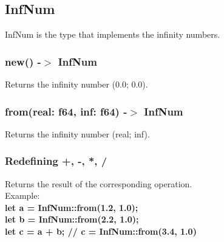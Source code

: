 \documentclass[]{article}
\begin{document}
			\subsection{InfNum}
				\Large{InfNum is the type that implements the infinity numbers.}
				\subsubsection{new() -$>$ InfNum}
					Returns the infinity number (0.0; 0.0).
				\subsubsection{from(real: f64, inf: f64) -$>$ InfNum}
					Returns the infinity number (real; inf).
				\subsubsection{Redefining +, -, *, /}
					Returns the result of the corresponding operation.\\Example:\\
					\large{\textbf{let a = InfNum::from(1.2, 1.0);\\
						let b = InfNum::from(2.2, 1.0);\\
						let c = a + b; // c = InfNum::from(3.4, 1.0)}}
\end{document}
